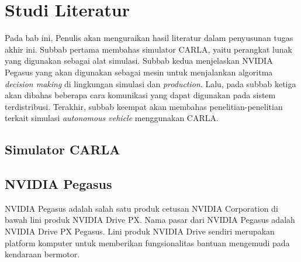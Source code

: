 \chapter{Studi Literatur}

Pada bab ini, Penulis akan menguraikan hasil literatur dalam penyusunan tugas
akhir ini. Subbab pertama membahas simulator CARLA, yaitu perangkat lunak yang
digunakan sebagai alat simulasi. Subbab kedua menjelaskan NVIDIA Pegasus yang
akan digunakan sebagai mesin untuk menjalankan algoritma \textit{decision
      making} di lingkungan simulasi dan \textit{production}. Lalu, pada subbab
ketiga akan dibahas beberapa cara komunikasi yang dapat digunakan pada sistem
terdistribusi. Terakhir, subbab keempat akan membahas penelitian-penelitian
terkait simulasi \textit{autonomous vehicle} menggunakan CARLA.

\section{Simulator CARLA}
\blindtext


\section{NVIDIA Pegasus}

NVIDIA Pegasus adalah salah satu produk cetusan NVIDIA Corporation di bawah
lini produk NVIDIA Drive PX. Nama pasar dari NVIDIA Pegasus adalah NVIDIA Drive
PX Pegasus. Lini produk NVIDIA Drive sendiri merupakan platform komputer untuk
memberikan fungsionalitas bantuan mengemudi pada kendaraan bermotor.

